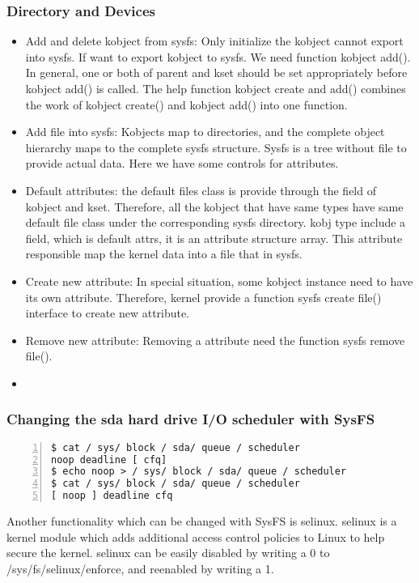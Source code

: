 \documentclass[10pt,draftclsnofoot,journal,compsoc,onecolumn]{IEEEtran}
\begin{document}
\subsubsection{Directory and Devices}
\begin{itemize}
\item Add and delete kobject from sysfs: Only initialize the kobject cannot export into sysfs. If want to export kobject to sysfs. We need function kobject add(). In general, one or both of parent and kset should be set appropriately before kobject add() is called. The help function kobject create and add() combines the work of kobject create() and kobject add() into one function.
\item Add file into sysfs: Kobjects map to directories, and the complete object hierarchy maps to the complete sysfs structure. Sysfs is a tree without file to provide actual data. Here we have some controls for attributes.
\item Default attributes: the default files class is provide through the field of kobject and kset. Therefore, all the kobject that have same types have same default file class under the corresponding sysfs directory. kobj type include a field, which is default attrs, it is an attribute structure array. This attribute responsible map the kernel data into a file that in sysfs.
\item Create new attribute: In special situation, some kobject instance need to have its own attribute. Therefore, kernel provide a function sysfs create file() interface to create new attribute.
\item Remove new attribute: Removing a attribute need the function sysfs remove file().
\item
\end{itemize}

\subsubsection{Changing the sda hard drive I/O scheduler with SysFS}
\begin{lstlisting}[numbers=left]
$ cat / sys/ block / sda/ queue / scheduler
noop deadline [ cfq]
$ echo noop > / sys/ block / sda/ queue / scheduler
$ cat / sys/ block / sda/ queue / scheduler
[ noop ] deadline cfq

\end{lstlisting}

\par Another functionality which can be changed with SysFS is selinux. selinux is a kernel module which adds additional access control policies to Linux to help secure the kernel. selinux can be easily disabled by writing a 0 to /sys/fs/selinux/enforce, and reenabled by writing a 1.
\end{document}
